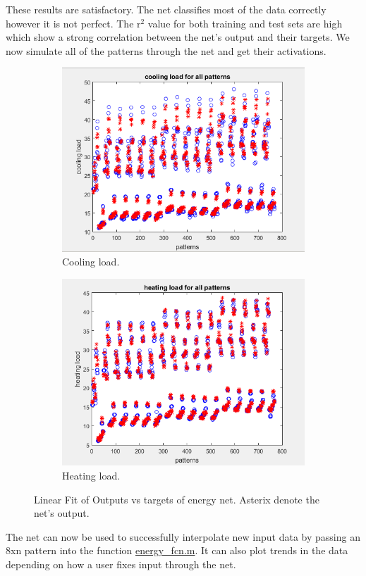 \documentclass[10pt]{article}
\begin{document}
These results are satisfactory. The net classifies most of the data correctly however it is not perfect. The r$^{2}$ value for both training and test sets are high which show a strong correlation between the net's output and their targets. We now simulate all of the patterns through the net and get their activations. 


\begin{center}
\begin{figure}[h]
  \begin{subfigure}[b]{0.49\textwidth}
    \includegraphics[width=\textwidth]{ee_cl}
    \caption{Cooling load.}
    \label{fig:1}
  \end{subfigure}
  \begin{subfigure}[b]{0.49\textwidth}
    \includegraphics[width=\textwidth]{ee_hl}
    \caption{Heating load.}
    \label{fig:2}
  \end{subfigure}
  \caption{Linear Fit of Outputs vs targets of energy net. Asterix denote the net's output.}
\end{figure}
\end{center}
The net can now be used to successfully interpolate new input data by passing an 8xn pattern into the function \url{energy_fcn.m}. It can also plot trends in the data depending on how a user fixes input through the net. 
\end{document}
